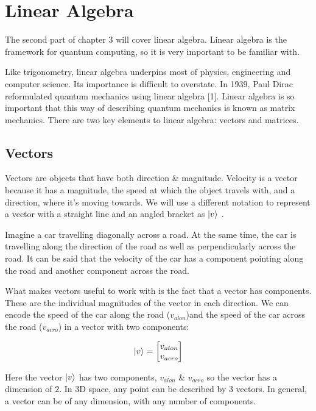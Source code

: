 \documentclass{book}
\begin{document}
\section{Linear Algebra}

The second part of chapter 3 will cover linear algebra. Linear algebra is the framework for quantum computing, so it is very important to be familiar with. 

Like trigonometry, linear algebra underpins most of physics, engineering and computer science. Its importance is difficult to overstate. In 1939, Paul Dirac reformulated quantum mechanics using linear algebra [1]. Linear algebra is so important that this way of describing quantum mechanics is known as matrix mechanics. There are two key elements to linear algebra: vectors and matrices. 

\subsection{ Vectors}

Vectors are objects that have both direction \& magnitude. Velocity is a vector because it has a magnitude, the speed at which the object travels with, and a direction, where it's moving towards. We will use a different notation to represent a vector with a straight line and an angled bracket as $ \ket{v} $ .

Imagine a car travelling diagonally across a road. At the same time, the car is travelling along the direction of the road as well as perpendicularly across the road. It can be said that the velocity of the car has a component pointing along the road and another component across the road. 

What makes vectors useful to work with is the fact that a vector has components. These are the individual magnitudes of the vector in each direction. We can encode the speed of the car along the road ($v_{alon}$)and the speed of the car across the road ($v_{acro}$) in a vector with two components: 

$$
\ket{v} = \begin{bmatrix}v_{alon} \\ v_{acro}
\end{bmatrix}
$$

Here the vector $\ket{v}$ has two components, $v_{alon}$ \& $v_{acro}$ so the vector has a dimension of 2. In 3D space, any point can be described by 3 vectors. In general, a vector can be of any dimension, with any number of components. 
\end{document}
